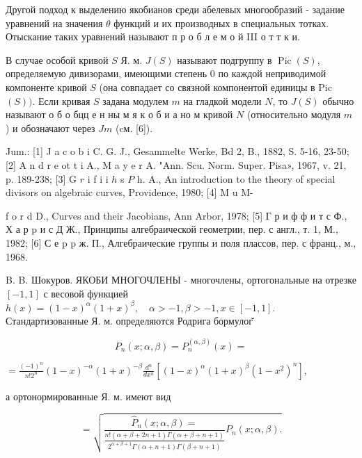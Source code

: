 \documentclass[10pt]{article}
\begin{document}
Другой подход к выделению якобианов среди абелевых многообразий - задание уравнений на значения $\theta$ функций и их производных в специальных тотках. Отыскание таких уравнений называют п р о б л е м о й III $о$ т т к и.



В случае особой кривой $S$ Я. м. $J(S)$ называют подгруппу в $\operatorname{Pic}(S)$, определяемую дивизорами, имеющими степень 0 по каждой неприводимой компоненте кривой $S$ (она совпадает со связной компонентой единицы в Pic $(S))$. Если кривая $S$ задана модулем $m$ на гладкой модели $N$, то $J(S)$ обычно называют о б о бцц е н ны м я к о б и а но м кривой $N$ (относительно модуля $m$ ) и обозначают через $J m$ (cм. [6]).



Jum.: [1] J a c o b i C. G. J., Gesammelte Werke, Bd 2, B., 1882, S. 5-16, 23-50; [2] A n d r e ot t i A., M a y e r A. "Ann. Scu. Norm. Super. Pisa», 1967, v. 21, p. 189-238; [3] G $r$ i f i i $h$ s $P$ h. A., An introduction to the theory of special divisors on algebraic curves, Providence, 1980; [4] M u M-

f o r d D., Curves and their Jacobians, Ann Arbor, 1978; [5] Г р и ф ф и т с Ф., Х а р p и с Д Ж., Принципы алгебраической геометрии, пер. с англ., т. 1, М., 1982; [6] С е p p ж. П., Алгебраические группы и поля плассов, пер. с франц., м., 1968.



B. B. Шокуров. ЯКОБИ МНОГОЧЛЕНЫ - многочлены, ортогональные на отрезке $[-1,1]$ с весовой функцией $h(x)=(1-x)^{\alpha}(1+x)^{\beta}, \quad \alpha>-1, \beta>-1, x \in[-1,1]$. Стандартизованные Я. м. определяются Родрига бормулог̆



\[

P_{n}(x ; \alpha, \beta)=P_{n}^{(\alpha, \beta)}(x)=

\]



$=\frac{(-1)^{n}}{n ! 2^{n}}(1-x)^{-\alpha}(1+x)^{-\beta} \frac{d^{n}}{d x^{n}}\left[(1-x)^{\alpha}(1+x)^{\beta}\left(1-x^{2}\right)^{n}\right]$,



а ортонормированные Я. м. имеют вид



\[

=\sqrt{\frac{\hat{P}_{n}(x ; \alpha, \beta)=}{\frac{n !(\alpha+\beta+2 n+1) \Gamma(\alpha+\beta+n+1)}{2^{\alpha+\beta+1} \Gamma(\alpha+n+1) \Gamma(\beta+n+1)}} P_{n}(x ; \alpha, \beta) .}

\]
\end{document}

